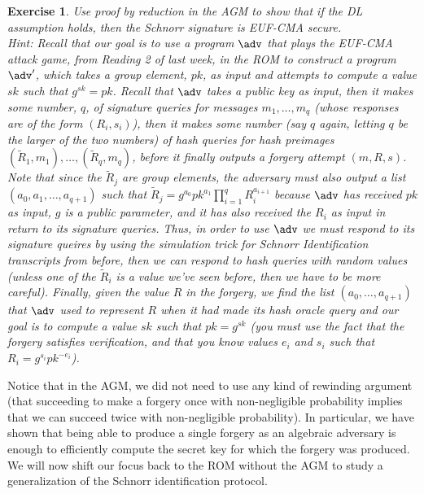 \documentclass[12pt]{article}
\newtheorem{exercise}{Exercise}
\theoremstyle{definition}
\theoremstyle{remark}
\theoremstyle{definition}
\begin{document}
\begin{exercise}
Use proof by reduction in the AGM to show that if the DL assumption holds, then the Schnorr signature is EUF-CMA secure.\\

Hint: Recall that our goal is to use a program $\adv$ that plays the EUF-CMA attack game, from Reading 2 of last week, in the ROM to construct a program $\adv'$, which takes a group element, $pk$, as input and attempts to compute a value $sk$ such that $g^{sk} = pk$. Recall that $\adv$ takes a public key as input, then it makes some number, $q$, of signature queries for messages $m_1, \ldots, m_q$ (whose responses are of the form $(R_i, s_i)$), then it makes some number (say $q$ again, letting $q$ be the larger of the two numbers) of hash queries for hash preimages $(\tilde{R}_1, m_1),\ldots, (\tilde{R}_q, m_q)$, before it finally outputs a forgery attempt $(m, R, s)$. Note that since the $\tilde{R}_j$ are group elements, the adversary must also output a list $(a_0, a_1, \ldots, a_{q+1})$ such that $\tilde{R}_j = g^{a_0}pk^{a_1}\prod_{i=1}^qR_i^{a_{i+1}}$ because $\adv$ has received $pk$ as input, $g$ is a public parameter, and it has also received the $R_i$ as input in return to its signature queries. Thus, in order to use $\adv$ we must respond to its signature queires by using the simulation trick for Schnorr Identification transcripts from before, then we can respond to hash queries with random values (unless one of the $\tilde{R}_i$ is a value we've seen before, then we have to be more careful). Finally, given the value $R$ in the forgery, we find the list $(a_0, \ldots, a_{q+1})$ that $\adv$ used to represent $R$ when it had made its hash oracle query and our goal is to compute a value $sk$ such that $pk = g^{sk}$ (you must use the fact that the forgery satisfies verification, and that you know values $e_i$ and $s_i$ such that $R_i = g^{s_i}pk^{-e_i}$).
\end{exercise}

Notice that in the AGM, we did not need to use any kind of rewinding argument (that succeeding to make a forgery once with non-negligible probability implies that we can succeed twice with non-negligible probability). In particular, we have shown that being able to produce a single forgery as an algebraic adversary is enough to efficiently compute the secret key for which the forgery was produced.\\

We will now shift our focus back to the ROM without the AGM to study a generalization of the Schnorr identification protocol.
\end{document}

